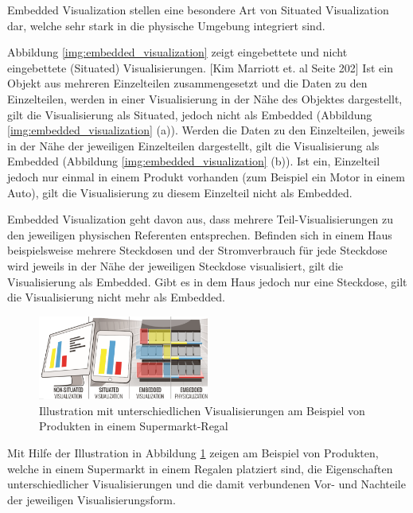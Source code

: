 \cite[S.~195]{ElSayedNevenA.M.BruceH.ThomasRossT.Smith2015} Embedded Visualization stellen eine besondere Art von Situated Visualization dar, welche sehr stark in die physische Umgebung integriert sind. 

Abbildung \ref{img:embedded_visualization} zeigt eingebettete und nicht eingebettete (Situated) Visualisierungen. [Kim Marriott et. al Seite 202] Ist ein Objekt aus mehreren Einzelteilen 
zusammengesetzt und die Daten zu den Einzelteilen, werden in einer Visualisierung in der Nähe des Objektes dargestellt, gilt die Visualisierung als Situated, jedoch nicht als Embedded (Abbildung \ref{img:embedded_visualization} (a)).
Werden die Daten zu den Einzelteilen, jeweils in der Nähe der jeweiligen Einzelteilen dargestellt, gilt die Visualisierung als Embedded (Abbildung \ref{img:embedded_visualization} (b)). Ist ein, Einzelteil jedoch nur einmal in einem Produkt vorhanden (zum Beispiel ein Motor in einem Auto), gilt die Visualisierung zu diesem Einzelteil nicht als Embedded. 

Embedded Visualization geht davon aus, dass mehrere Teil-Visualisierungen zu den jeweiligen physischen Referenten entsprechen. Befinden sich in einem Haus beispielsweise mehrere Steckdosen und der Stromverbrauch 
für jede Steckdose wird jeweils in der Nähe der jeweiligen Steckdose visualisiert, gilt die Visualisierung als Embedded. Gibt es in dem Haus jedoch nur eine Steckdose, gilt die Visualisierung nicht mehr als
Embedded.

\vspace{15mm} 
\begin{figure}[H]
	\centering
	\includegraphics[width=0.5\textwidth]{resources/fundamentals/situated_visualization/Illustration_situated_embedded_visualization.png}
	\caption{Illustration mit unterschiedlichen Visualisierungen am Beispiel von Produkten in einem Supermarkt-Regal \cite{Illustration Visualisierungen}}
	\label{img:Illustration_situated_embedded_visualization}
\end{figure}

Mit Hilfe der Illustration in Abbildung \ref{img:Illustration_situated_embedded_visualization} zeigen \cite{WesleyWillettYvonneJansen} am Beispiel von Produkten, 
welche in einem Supermarkt in einem Regalen platziert sind, die Eigenschaften unterschiedlicher Visualisierungen und die damit verbundenen Vor- und Nachteile der jeweiligen Visualisierungsform. 

